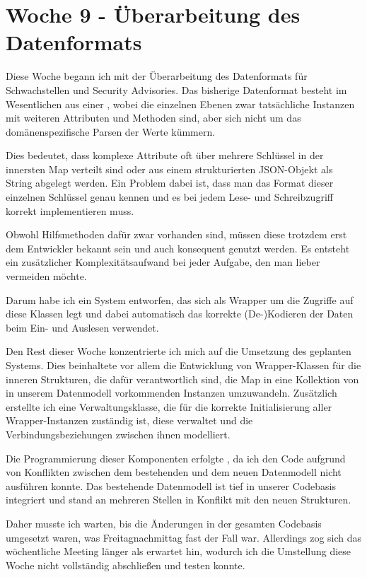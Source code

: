 \section{Woche 9 - Überarbeitung des Datenformats} \label{sec:bericht-wo-x}



Diese Woche begann ich mit der Überarbeitung des Datenformats für Schwachstellen und Security Advisories.
Das bisherige Datenformat besteht im Wesentlichen aus einer , wobei die einzelnen Ebenen zwar tatsächliche Instanzen mit weiteren Attributen und Methoden sind, aber sich nicht um das domänenspezifische  Parsen der Werte kümmern.

Dies bedeutet, dass komplexe Attribute oft über mehrere Schlüssel in der innersten Map verteilt sind oder aus einem strukturierten JSON-Objekt als String abgelegt werden.
Ein Problem dabei ist, dass man das Format dieser einzelnen Schlüssel genau kennen und es bei jedem Lese- und Schreibzugriff korrekt implementieren muss.

Obwohl Hilfsmethoden dafür zwar vorhanden sind, müssen diese trotzdem erst dem Entwickler bekannt sein und auch konsequent genutzt werden.
Es entsteht ein zusätzlicher Komplexitätsaufwand bei jeder Aufgabe, den man lieber vermeiden möchte.

Darum habe ich ein System entworfen, das sich als Wrapper um die Zugriffe auf diese Klassen legt und dabei automatisch das korrekte (De-)Kodieren der Daten beim Ein- und Auslesen verwendet.


Den Rest dieser Woche konzentrierte ich mich auf die Umsetzung des geplanten Systems.
Dies beinhaltete vor allem die Entwicklung von Wrapper-Klassen für die inneren  Strukturen, die dafür verantwortlich sind, die Map in eine Kollektion von in unserem Datenmodell vorkommenden Instanzen umzuwandeln.
Zusätzlich erstellte ich eine Verwaltungsklasse, die für die korrekte Initialisierung aller Wrapper-Instanzen zuständig ist, diese verwaltet und die Verbindungsbeziehungen zwischen ihnen modelliert.

Die Programmierung dieser Komponenten erfolgte , da ich den Code aufgrund von Konflikten zwischen dem bestehenden und dem neuen Datenmodell nicht ausführen konnte.
Das bestehende Datenmodell ist tief in unserer Codebasis integriert und stand an mehreren Stellen in Konflikt mit den neuen Strukturen.

Daher musste ich warten, bis die Änderungen in der gesamten Codebasis umgesetzt waren, was Freitagnachmittag fast der Fall war.
Allerdings zog sich das wöchentliche Meeting länger als erwartet hin, wodurch ich die Umstellung diese Woche nicht vollständig abschließen und testen konnte.
